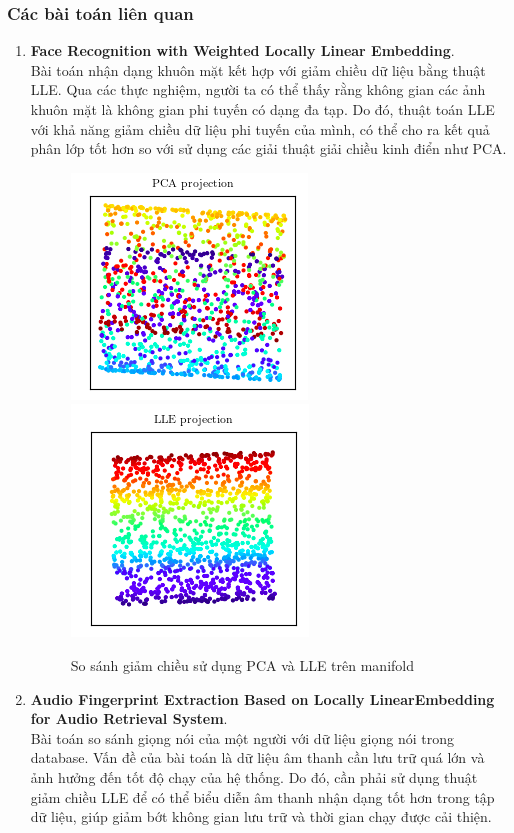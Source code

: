 \subsubsection{Các bài toán liên quan}
\begin{enumerate}
	\item \textbf{Face Recognition with Weighted Locally Linear Embedding}.\\ Bài toán nhận dạng khuôn mặt kết hợp với giảm chiều dữ liệu bằng thuật LLE. Qua các thực nghiệm, người ta có thể thấy rằng không gian các ảnh khuôn mặt là không gian phi tuyến có dạng đa tạp. Do đó, thuật toán LLE với khả năng giảm chiều dữ liệu phi tuyến của mình, có thể cho ra kết quả phân lớp tốt hơn so với sử dụng các giải thuật giải chiều kinh điển như PCA.
	\begin{figure}[H]
		\begin{center}
			\includegraphics[scale=0.6]{images/ex1/pca.png}
			\includegraphics[scale=0.6]{images/ex1/lle.png}
			\caption{So sánh giảm chiều sử dụng PCA và LLE trên manifold}
		\end{center}
	\end{figure}
	\item \textbf{Audio Fingerprint Extraction Based on Locally LinearEmbedding for Audio Retrieval System}.\\ Bài toán so sánh giọng nói của một người với dữ liệu giọng nói trong database. Vấn đề của bài toán là dữ liệu âm thanh cần lưu trữ quá lớn và ảnh hưởng đến tốt độ chạy của hệ thống. Do đó, cần phải sử dụng thuật giảm chiều LLE để có thể biểu diễn âm thanh nhận dạng tốt hơn trong tập dữ liệu, giúp giảm bớt không gian lưu trữ và thời gian chạy được cải thiện.

\end{enumerate}
